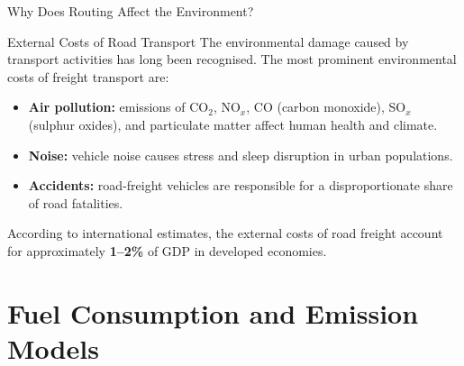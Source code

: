\documentclass[aspectratio=169,10pt]{beamer}
\begin{document}
\begin{frame}[allowframebreaks]{Why Does Routing Affect the Environment?}
  \framebreak

  \begin{block}{External Costs of Road Transport}
    The environmental damage caused by transport activities has long been
    recognised.  The most prominent environmental costs of freight transport are:
    \begin{itemize}
      \item \textbf{Air pollution:} emissions of CO$_2$, NO$_x$, CO (carbon
      monoxide), SO$_x$ (sulphur oxides), and particulate matter affect human
      health and climate.
      \item \textbf{Noise:} vehicle noise causes stress and sleep disruption in
      urban populations.
      \item \textbf{Accidents:} road-freight vehicles are responsible for a
      disproportionate share of road fatalities.
    \end{itemize}
    According to international estimates, the external costs of road freight
    account for approximately \textbf{1--2\%} of GDP in developed economies.
  \end{block}

\end{frame}

\section{Fuel Consumption and Emission Models}
\end{document}
